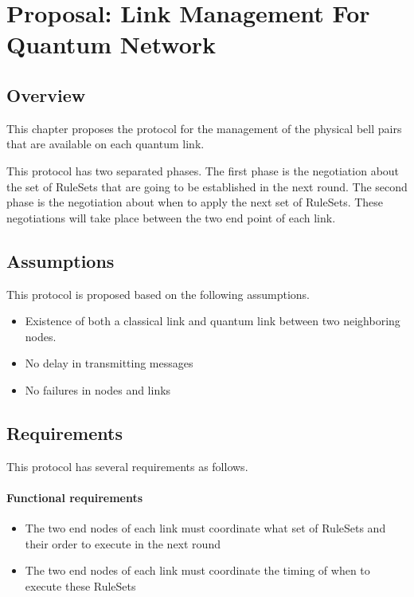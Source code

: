 \chapter{Proposal: Link Management For Quantum Network}
\label{proposal}

\section{Overview}

This chapter proposes the protocol for the management of the physical bell pairs that are available on each quantum link.

This protocol has two separated phases. The first phase is the negotiation about the set of RuleSets that are going to be established in the next round. The second phase is the negotiation about when to apply the next set of RuleSets.
These negotiations will take place between the two end point of each link.

\section{Assumptions}

This protocol is proposed based on the following assumptions.

\begin{itemize}
  \item Existence of both a classical link and quantum link between two neighboring nodes.
  \item No delay in transmitting messages 
  \item No failures in nodes and links
\end{itemize}

\section{Requirements}

This protocol has several requirements as follows.

\subsubsection{Functional requirements}

\begin{itemize}
  \item The two end nodes of each link must coordinate what set of RuleSets and their order to execute in the next round
  \item The two end nodes of each link must coordinate the timing of when to execute these RuleSets
\end{itemize}


